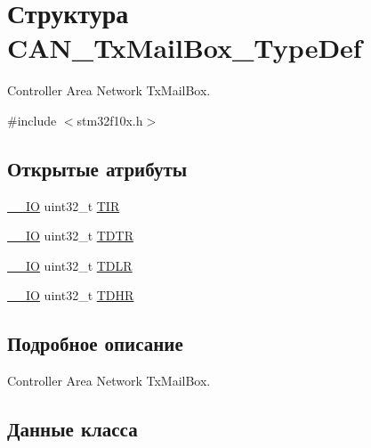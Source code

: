 \hypertarget{struct_c_a_n___tx_mail_box___type_def}{}\section{Структура C\+A\+N\+\_\+\+Tx\+Mail\+Box\+\_\+\+Type\+Def}
\label{struct_c_a_n___tx_mail_box___type_def}


Controller Area Network Tx\+Mail\+Box.  




{\ttfamily \#include $<$stm32f10x.\+h$>$}

\subsection*{Открытые атрибуты}
\begin{DoxyCompactItemize}
\item 
\mbox{\hyperlink{group___c_m_s_i_s___c_m3__core__definitions_gaec43007d9998a0a0e01faede4133d6be}{\+\_\+\+\_\+\+IO}} uint32\+\_\+t \mbox{\hyperlink{struct_c_a_n___tx_mail_box___type_def_a22f525c909de2dcec1d4093fe1d562b8}{T\+IR}}
\item 
\mbox{\hyperlink{group___c_m_s_i_s___c_m3__core__definitions_gaec43007d9998a0a0e01faede4133d6be}{\+\_\+\+\_\+\+IO}} uint32\+\_\+t \mbox{\hyperlink{struct_c_a_n___tx_mail_box___type_def_a2351cb865d064cf75f61642aaa887f76}{T\+D\+TR}}
\item 
\mbox{\hyperlink{group___c_m_s_i_s___c_m3__core__definitions_gaec43007d9998a0a0e01faede4133d6be}{\+\_\+\+\_\+\+IO}} uint32\+\_\+t \mbox{\hyperlink{struct_c_a_n___tx_mail_box___type_def_a408c96501b1cc8bd527432736d132a39}{T\+D\+LR}}
\item 
\mbox{\hyperlink{group___c_m_s_i_s___c_m3__core__definitions_gaec43007d9998a0a0e01faede4133d6be}{\+\_\+\+\_\+\+IO}} uint32\+\_\+t \mbox{\hyperlink{struct_c_a_n___tx_mail_box___type_def_a98c6bcd7c9bae378ebf83fd9f5b59020}{T\+D\+HR}}
\end{DoxyCompactItemize}


\subsection{Подробное описание}
Controller Area Network Tx\+Mail\+Box. 

\subsection{Данные класса}
\mbox{\label{struct_c_a_n___tx_mail_box___type_def_a98c6bcd7c9bae378ebf83fd9f5b59020}} 
